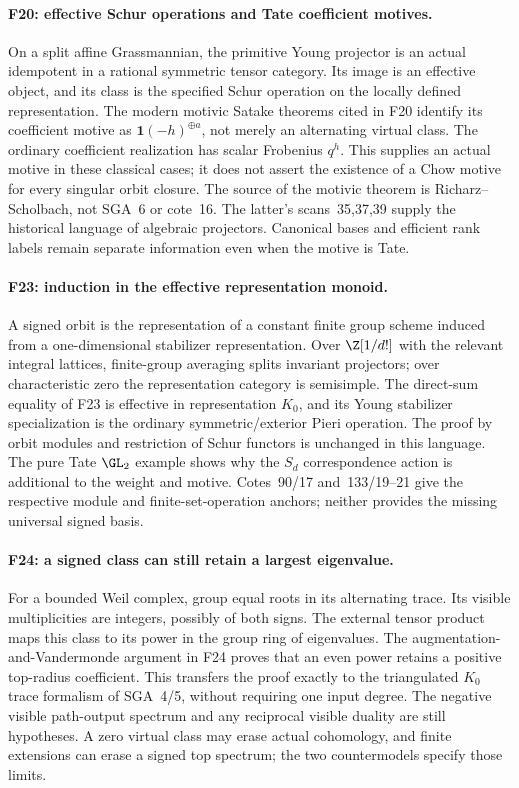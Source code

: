 \documentclass[11pt,a4paper]{article}
\newcommand{\fid}[1]{\textsf{#1}}\newcommand{\gate}[1]{\textsf{#1}}
\theoremstyle{named}\newtheorem{finding}{Finding}[section]
\theoremstyle{definition}\newtheorem{definition}[finding]{Definition}
\theoremstyle{remark}\newtheorem{remark}[finding]{Remark}
\begin{document}
\paragraph{\fid{F20}: effective Schur operations and Tate coefficient motives.}
On a split affine Grassmannian, the primitive Young projector is an
actual idempotent in a rational symmetric tensor category. Its image
is an effective object, and its class is the specified Schur operation
on the locally defined representation. The modern motivic Satake
theorems cited in \fid{F20} identify its coefficient motive as
$\mathbf1(-h)^{\oplus a}$, not merely an alternating virtual class.
The ordinary coefficient realization has scalar Frobenius $q^h$.
This supplies an actual motive in these classical cases; it does not
assert the existence of a Chow motive for every singular orbit closure.
The source of the motivic theorem is Richarz--Scholbach, not SGA~6
or cote~16. The latter's scans~35,37,39 supply the historical language
of algebraic projectors. Canonical bases and efficient rank labels
remain separate information even when the motive is Tate.

\paragraph{\fid{F23}: induction in the effective representation monoid.}
A signed orbit is the representation of a constant finite group
scheme induced from a one-dimensional stabilizer representation.
Over $\Z[1/d!]$ with the relevant integral lattices, finite-group
averaging splits invariant projectors; over characteristic zero
the representation category is semisimple. The direct-sum equality
of \fid{F23} is effective in representation $K_0$, and its Young
stabilizer specialization is the ordinary symmetric/exterior Pieri
operation. The proof by orbit modules and restriction of Schur
functors is unchanged in this language. The pure Tate $\GL_2$
example shows why the $S_d$ correspondence action is additional to
the weight and motive. Cotes~90/17 and~133/19--21 give the respective
module and finite-set-operation anchors; neither provides the missing
universal signed basis.

\paragraph{\fid{F24}: a signed class can still retain a largest eigenvalue.}
For a bounded Weil complex, group equal roots in its alternating trace.
Its visible multiplicities are integers, possibly of both signs.
The external tensor product maps this class to its power in the
group ring of eigenvalues. The augmentation-and-Vandermonde argument
in \fid{F24} proves that an even power retains a positive top-radius
coefficient. This transfers the proof exactly to the triangulated
$K_0$ trace formalism of SGA~4/5, without requiring one input degree.
The negative visible path-output spectrum and any reciprocal visible
duality are still hypotheses. A zero virtual class may erase actual
cohomology, and finite extensions can erase a signed top spectrum;
the two countermodels specify those limits.
\end{document}

